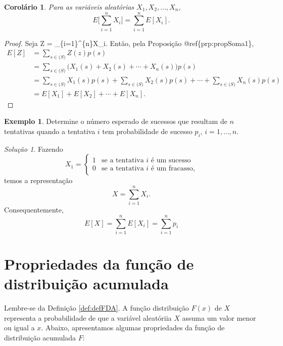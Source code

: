 \documentclass[]{book}
\newtheorem{corollary}{Corolário}[chapter]
\theoremstyle{definition}
\theoremstyle{definition}
\newtheorem{example}{Exemplo}[chapter]
\theoremstyle{definition}
\theoremstyle{remark}
\newtheorem*{solution}{Solução}
\begin{document}
\begin{corollary}
\protect\hypertarget{cor:unnamed-chunk-202}{}{\label{cor:unnamed-chunk-202} }Para as variáveis aleatórias \(X_1, X_2, \ldots, X_n\),
\[E\bigg[\sum_{i=1}^{n}X_i\bigg] = \sum_{i=1}^{n}E[X_i].\]
\end{corollary}

\begin{proof}
\iffalse{} {Prova. } \fi{}Seja Z = \sum\_\{i=1\}\^{}\{n\}X\_i.
Então, pela Proposição @ref\{prp:propSoma1\},
\begin{align*}
E[Z] &= \sum_{s\in\mathcal(S)}Z(z)p(s)\\
&= \sum_{s\in\mathcal(S)}\big(X_1(s)+X_2(s)+\cdots+X_n(s)\big)p(s)\\
&= \sum_{s\in\mathcal(S)}X_1(s)p(s) + \sum_{s\in\mathcal(S)}X_2(s)p(s) + \cdots + \sum_{s\in\mathcal(S)}X_n(s)p(s)\\
&= E[X_1] + E[X_2] + \cdots + E[X_n].
\end{align*}
\end{proof}

\begin{example}
\protect\hypertarget{exm:unnamed-chunk-204}{}{\label{exm:unnamed-chunk-204} }Determine o número esperado de sucessos que resultam de \(n\) tentativas quando a tentativa \(i\) tem probabilidade de sucesso \(p_i\), \(i = 1,\ldots, n\).
\end{example}

\begin{solution}
\iffalse{} {Solução. } \fi{}Fazendo
\begin{equation*}
  X_1 =
    \begin{cases}
      1 & \text{se a tentativa $i$ é um sucesso}\\
      0 & \text{se a tentativa $i$ é um fracasso,}
    \end{cases}       
\end{equation*}
temos a representação
\[X=\sum_{i=1}^{n}X_i.\]
Consequentemente,
\[E[X] = \sum_{i=1}^{n}E[X_i] = \sum_{i=1}^{n}p_i\]
\end{solution}

\hypertarget{propriedades-da-funuxe7uxe3o-de-distribuiuxe7uxe3o-acumulada}{%
\section{Propriedades da função de distribuição acumulada}\label{propriedades-da-funuxe7uxe3o-de-distribuiuxe7uxe3o-acumulada}}

Lembre-se da Definição \ref{def:defFDA}.
A função distribuição \(F(x)\) de \(X\) representa a probabilidade de que a variável aleatóriia \(X\) assuma um valor menor ou igual a \(x\).
Abaixo, apresentamos algumas propriedades da função de distribuição acumulada \(F\):
\end{document}
